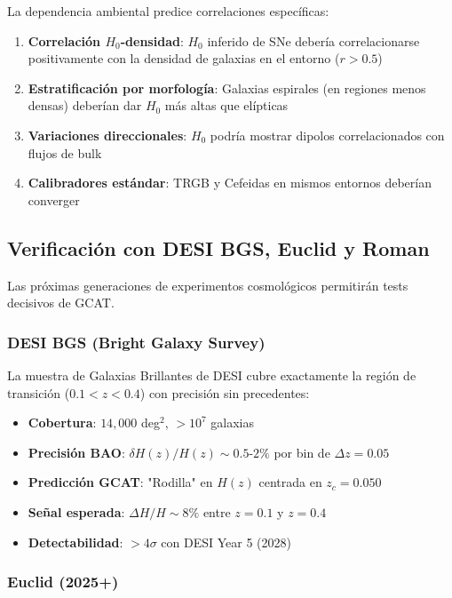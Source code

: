 \documentclass[12pt, a4paper]{article}
\theoremstyle{plain}
\theoremstyle{definition}
\begin{document}
La dependencia ambiental predice correlaciones específicas:

\begin{enumerate}
    \item \textbf{Correlación $H_0$-densidad}: $H_0$ inferido de SNe debería correlacionarse positivamente con la densidad de galaxias en el entorno ($r > 0.5$)
    \item \textbf{Estratificación por morfología}: Galaxias espirales (en regiones menos densas) deberían dar $H_0$ más altas que elípticas
    \item \textbf{Variaciones direccionales}: $H_0$ podría mostrar dipolos correlacionados con flujos de bulk
    \item \textbf{Calibradores estándar}: TRGB y Cefeidas en mismos entornos deberían converger
\end{enumerate}

\subsection{Verificación con DESI BGS, Euclid y Roman}

Las próximas generaciones de experimentos cosmológicos permitirán tests decisivos de GCAT.

\subsubsection{DESI BGS (Bright Galaxy Survey)}

La muestra de Galaxias Brillantes de DESI cubre exactamente la región de transición ($0.1 < z < 0.4$) con precisión sin precedentes:

\begin{itemize}
    \item \textbf{Cobertura}: $14,000$ deg$^2$, $> 10^7$ galaxias
    \item \textbf{Precisión BAO}: $\delta H(z)/H(z) \sim 0.5$-$2\%$ por bin de $\Delta z = 0.05$
    \item \textbf{Predicción GCAT}: "Rodilla" en $H(z)$ centrada en $z_c = 0.050$
    \item \textbf{Señal esperada}: $\Delta H/H \sim 8\%$ entre $z=0.1$ y $z=0.4$
    \item \textbf{Detectabilidad}: $> 4\sigma$ con DESI Year 5 (2028)
\end{itemize}

\subsubsection{Euclid (2025+)}
\end{document}
